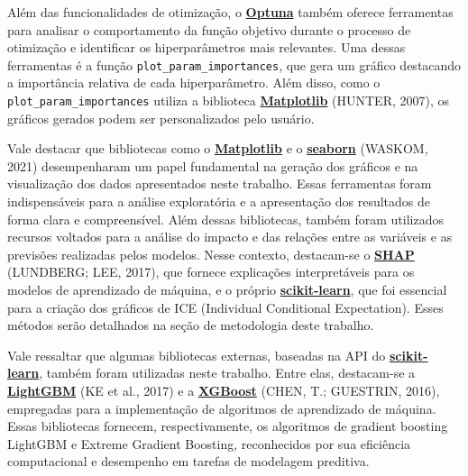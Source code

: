 \documentclass[
  12pt,
  a4paper,
]{scrreprt}
\begin{document}
\vspace{12pt}

Além das funcionalidades de otimização, o
\href{https://optuna.org/}{\textbf{Optuna}} também oferece ferramentas
para analisar o comportamento da função objetivo durante o processo de
otimização e identificar os hiperparâmetros mais relevantes. Uma dessas
ferramentas é a função \texttt{plot\_param\_importances}, que gera um
gráfico destacando a importância relativa de cada hiperparâmetro. Além
disso, como o \texttt{plot\_param\_importances} utiliza a biblioteca
\href{https://matplotlib.org/}{\textbf{Matplotlib}} (HUNTER, 2007), os
gráficos gerados podem ser personalizados pelo usuário.

\vspace{12pt}

Vale destacar que bibliotecas como o
\href{https://matplotlib.org/}{\textbf{Matplotlib}} e o
\href{https://seaborn.pydata.org/}{\textbf{seaborn}} (WASKOM, 2021)
desempenharam um papel fundamental na geração dos gráficos e na
visualização dos dados apresentados neste trabalho. Essas ferramentas
foram indispensáveis para a análise exploratória e a apresentação dos
resultados de forma clara e compreensível. Além dessas bibliotecas,
também foram utilizados recursos voltados para a análise do impacto e
das relações entre as variáveis e as previsões realizadas pelos modelos.
Nesse contexto, destacam-se o
\href{https://shap.readthedocs.io/en/latest}{\textbf{SHAP}} (LUNDBERG;
LEE, 2017), que fornece explicações interpretáveis para os modelos de
aprendizado de máquina, e o próprio
\href{https://scikit-learn.org/stable/}{\textbf{scikit-learn}}, que foi
essencial para a criação dos gráficos de ICE (Individual Conditional
Expectation). Esses métodos serão detalhados na seção de metodologia
deste trabalho.

\vspace{12pt}

Vale ressaltar que algumas bibliotecas externas, baseadas na API do
\href{https://scikit-learn.org/stable/}{\textbf{scikit-learn}}, também
foram utilizadas neste trabalho. Entre elas, destacam-se a
\href{https://lightgbm.readthedocs.io/en/stable/}{\textbf{LightGBM}} (KE
et al., 2017) e a
\href{https://xgboost.readthedocs.io/en/stable/}{\textbf{XGBoost}}
(CHEN, T.; GUESTRIN, 2016), empregadas para a implementação de
algoritmos de aprendizado de máquina. Essas bibliotecas fornecem,
respectivamente, os algoritmos de gradient boosting LightGBM e Extreme
Gradient Boosting, reconhecidos por sua eficiência computacional e
desempenho em tarefas de modelagem preditiva.
\end{document}

